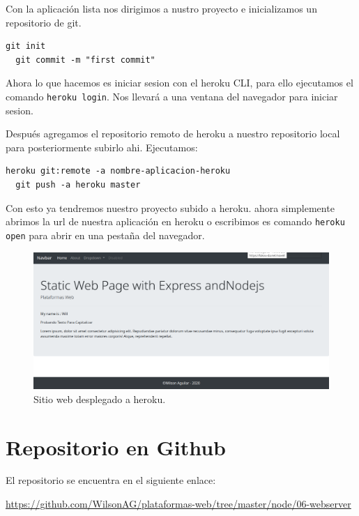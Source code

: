 \documentclass[12pt]{article}
\begin{document}
Con la aplicación lista nos dirigimos a nustro proyecto e inicializamos un repositorio de git.

\begin{lstlisting}[numbers=none]
  git init
  git commit -m "first commit"
\end{lstlisting}

Ahora lo que hacemos es iniciar sesion con el heroku CLI, para ello ejecutamos el comando \lstinline{heroku login}. Nos llevará a una ventana del navegador para iniciar sesion.

Después agregamos el repositorio remoto de heroku a nuestro repositorio local para posteriormente subirlo ahi. Ejecutamos:

\begin{lstlisting}[numbers=none]
  heroku git:remote -a nombre-aplicacion-heroku
  git push -a heroku master
\end{lstlisting}

Con esto ya tendremos nuestro proyecto subido a heroku. ahora simplemente abrimos la url de nuestra aplicación en heroku o escribimos es comando \lstinline{heroku open} para abrir en una pestaña del navegador.

\begin{figure}[H]
  \centering
  \includegraphics[scale=.35]{assets/images/web.png}
  \caption{Sitio web desplegado a heroku.}
\end{figure}

\section{Repositorio en Github}

El repositorio se encuentra en el siguiente enlace:

\url{https://github.com/WilsonAG/plataformas-web/tree/master/node/06-webserver}
\end{document}
